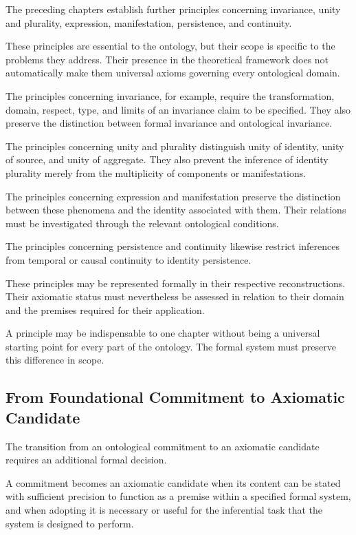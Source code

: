 The preceding chapters establish further principles
concerning invariance, unity and plurality, expression,
manifestation, persistence, and continuity.

These principles are essential to the ontology, but
their scope is specific to the problems they address.
Their presence in the theoretical framework does
not automatically make them universal axioms governing
every ontological domain.

The principles concerning invariance, for example,
require the transformation, domain, respect, type,
and limits of an invariance claim to be specified.
They also preserve the distinction between formal
invariance and ontological invariance.

The principles concerning unity and plurality
distinguish unity of identity, unity of source,
and unity of aggregate. They also prevent the
inference of identity plurality merely from the
multiplicity of components or manifestations.

The principles concerning expression and manifestation
preserve the distinction between these phenomena
and the identity associated with them. Their relations
must be investigated through the relevant ontological
conditions.

The principles concerning persistence and continuity
likewise restrict inferences from temporal or causal
continuity to identity persistence.

These principles may be represented formally in
their respective reconstructions. Their axiomatic
status must nevertheless be assessed in relation
to their domain and the premises required for their
application.

A principle may be indispensable to one chapter
without being a universal starting point for every
part of the ontology. The formal system must preserve
this difference in scope.

\subsection{From Foundational Commitment to Axiomatic Candidate}

The transition from an ontological commitment to
an axiomatic candidate requires an additional
formal decision.

A commitment becomes an axiomatic candidate when
its content can be stated with sufficient precision
to function as a premise within a specified formal
system, and when adopting it is necessary or useful
for the inferential task that the system is designed
to perform.

